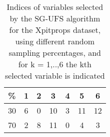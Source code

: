 \begin{table}
	\begin{center}
		\begin{tabular}{c c c c c c c}
			\% & 1 & 2 & 3 & 4 & 5 & 6 \\
			\hline
			30 & 6 & 0 & 10 & 3 & 11 & 12 \\
			70 & 2 & 8 & 11 & 0 & 4 & 3 \\
		\end{tabular}
	\end{center}
	\caption{Indices of variables selected by the SG-UFS algorithm for the Xpitprops dataset, using different random sampling percentages, and for k = 1,..,6 the kth selected variable is indicated}
\end{table}